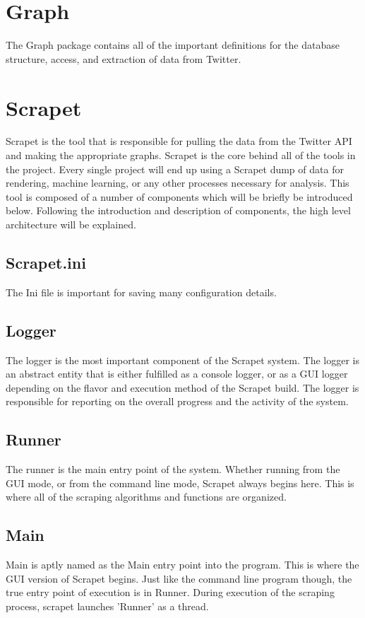 \section{Graph}
The Graph package contains all of the important definitions for the database structure, access, and extraction of data from Twitter.


\section{Scrapet}
Scrapet is the tool that is responsible for pulling the data from the Twitter API and making the appropriate graphs. Scrapet is the core behind all of the tools in the project. Every single project will end up using a Scrapet dump of data for rendering, machine learning, or any other processes necessary for analysis. This tool is composed of a number of components which will be briefly be introduced below. Following the introduction and description of components, the high level architecture will be explained.
\subsection{Scrapet.ini}
The Ini file is important for saving many configuration details.
\subsection{Logger}
The logger is the most important component of the Scrapet system. The logger is an abstract entity that is either fulfilled as a console logger, or as a GUI logger depending on the flavor and execution method of the Scrapet build. The logger is responsible for reporting on the overall progress and the activity of the system.
\subsection{Runner}
The runner is the main entry point of the system. Whether running from the GUI mode, or from the command line mode, Scrapet always begins here. This is where all of the scraping algorithms and functions are organized.
\subsection{Main}
Main is aptly named as the Main entry point into the program. This is where the GUI version of Scrapet begins. Just like the command line program though, the true entry point of execution is in Runner. During execution of the scraping process, scrapet launches 'Runner' as a thread.
